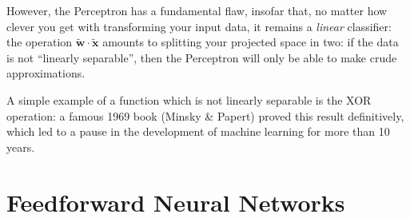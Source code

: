 \documentclass[10pt, twocolumn]{article}
\renewcommand\vec[1]{\boldsymbol{\textbf{#1}}}
\newcommand\cec[1]{\tilde{\vec{#1}}}
\begin{document}
			However, the Perceptron has a fundamental flaw, insofar that, no matter how clever you get with transforming your input data, it remains a \textit{linear} classifier: the operation $\cec{w} \cdot \cec{x}$ amounts to splitting your projected space in two: if the data is not ``linearly separable'', then the Perceptron will only be able to make crude approximations.
			
			A simple example of a function which is not linearly separable is the XOR operation: a famous 1969 book (Minsky \& Papert) proved this result definitively, which led to a pause in the development of machine learning for more than 10 years. 

	\section{Feedforward Neural Networks}
\end{document}
